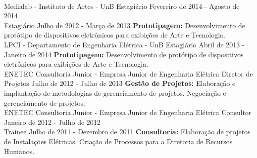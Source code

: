 \documentclass[a4paper]{twentysecondcv} %
\begin{document}
\begin{twenty}
{            \color{pblue}{\hspace{8pt}-\hspace{4pt}} 
        }
        \\
    \twentyitem
    	{Medialab - Instituto de Artes - UnB}
		{Estagiário \hfill Fevereiro de 2014 - Agosto de 2014\\}
		{Estagiário \hfill Julho de 2012 - Março de 2013}
        {
            \color{pblue}{\hspace{8pt}-\hspace{4pt}} \color{black}\textbf{
            Prototipagem: }Desenvolvimento de protótipo de dispositivos 
            eletrônicos para exibições de Arte e Tecnologia.
        }
        \\
    \twentyitem
    {LPCI - Departamento de Engenharia Elétrica - UnB}
    {Estagiário}
    {Abril de 2013 - Janeiro de 2014}
    {
        \color{pblue}{\hspace{8pt}-\hspace{4pt}} \color{black}\textbf{
        Prototipagem: }Desenvolvimento de protótipo de dispositivos eletrônicos 
        para exibições de Arte e Tecnologia.
    }
    \\
    \twentyitem
    {ENETEC Consultoria Junior - Empresa Junior de Engenharia Elétrica}
    {Diretor de Projetos}
    {Julho de 2012 - Julho de 2013}
    {\color{pblue}{\hspace{8pt}-\hspace{4pt}} \color{black}\textbf{Gestão de 
    Projetos: }Elaboração e implantação de metodologias de gerenciamento de 
    projetos. Negociação e gerenciamento de projetos.}
    \\
    \twentyitem
    {ENETEC Consultoria Junior - Empresa Junior de Engenharia Elétrica}
    {Consultor \hfill Janeiro de 2012 - Julho de 2012\\}
    {Trainee  \hfill Julho de 2011 - Dezembro de 2011}
    {\color{pblue}{\hspace{8pt}-\hspace{4pt}} \color{black}\textbf{Consultoria: }
    Elaboração de projetos de Instalações Elétricas. Criação de Processos para a 
    Diretoria de Recursos Humanos.}
\end{twenty}

\end{document}
